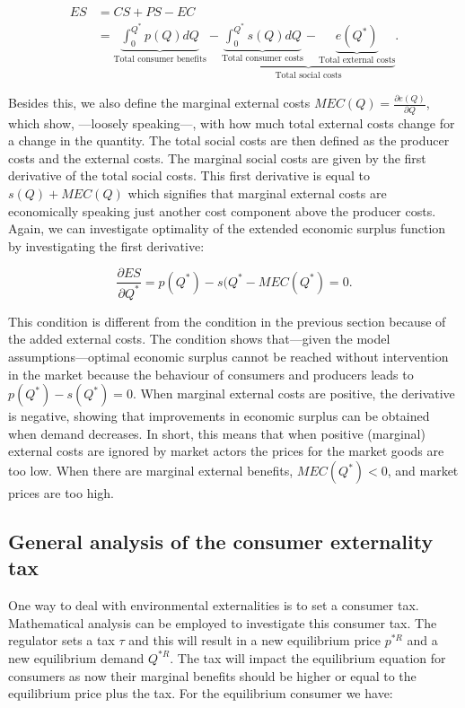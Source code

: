 \documentclass[
]{book}
\begin{document}
\begin{align}
ES &= CS + PS - EC \\
&= \underbrace{\int_0^{Q^\ast} p(Q)dQ}_\text{Total consumer benefits} - \underbrace{\underbrace{\int^{Q^\ast}_0 s(Q)dQ}_\text{Total consumer costs} - \underbrace{e(Q^\ast)}_\text{Total external costs}}_\text{Total social costs}.
\end{align}

Besides this, we also define the marginal external costs \(MEC(Q)=\frac{\partial e(Q)}{\partial Q}\), which show, ---loosely speaking---, with how much total external costs change for a change in the quantity. The total social costs are then defined as the producer costs and the external costs. The marginal social costs are given by the first derivative of the total social costs. This first derivative is equal to \(s(Q)+MEC(Q)\) which signifies that marginal external costs are economically speaking just another cost component above the producer costs. Again, we can investigate optimality of the extended economic surplus function by investigating the first derivative:

\begin{equation}
\frac{\partial ES}{\partial Q^\ast} = p(Q^\ast) - s(Q^\ast - MEC(Q^\ast) = 0.
\end{equation}

This condition is different from the condition in the previous section because of the added external costs. The condition shows that---given the model assumptions---optimal economic surplus cannot be reached without intervention in the market because the behaviour of consumers and producers leads to \(p(Q^\ast)-s(Q^\ast)=0\). When marginal external costs are positive, the derivative is negative, showing that improvements in economic surplus can be obtained when demand decreases. In short, this means that when positive (marginal) external costs are ignored by market actors the prices for the market goods are too low. When there are marginal external benefits, \(MEC(Q^\ast )<0\), and market prices are too high.

\hypertarget{general-analysis-of-the-consumer-externality-tax}{%
\subsection{General analysis of the consumer externality tax}\label{general-analysis-of-the-consumer-externality-tax}}

One way to deal with environmental externalities is to set a consumer tax. Mathematical analysis can be employed to investigate this consumer tax. The regulator sets a tax \(\tau\) and this will result in a new equilibrium price \(p^{\ast R}\) and a new equilibrium demand \(Q^{\ast R}\). The tax will impact the equilibrium equation for consumers as now their marginal benefits should be higher or equal to the equilibrium price plus the tax. For the equilibrium consumer we have:
\end{document}
